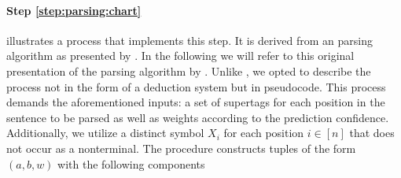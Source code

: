 \documentclass[../document.tex]{subfiles}
\begin{document}
    \paragraph{Step \ref{step:parsing:chart}}
     illustrates a process that implements this step.
    It is derived from an  parsing algorithm as presented by \citet[the na\"ive algorithm in sec.~3]{Burden05}.
    In the following we will refer to this original presentation of the parsing algorithm by .
    Unlike , we opted to describe the process not in the form of a deduction system but in pseudocode.
    This process demands the aforementioned inputs: a set of supertags for each position in the sentence to be parsed as well as weights according to the prediction confidence.
    Additionally, we utilize a distinct symbol \(X_i\) for each position \(i \in [n]\) that does not occur as a nonterminal.
    The procedure constructs tuples of the form \((a, b, w)\) with the following components
\end{document}
